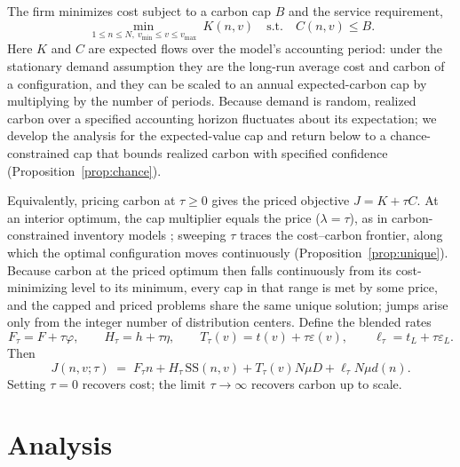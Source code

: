\documentclass[11pt]{article}
\theoremstyle{definition}
\theoremstyle{remark}
\theoremstyle{plain}
\newcommand{\sstock}{\mathrm{SS}}
\begin{document}
The firm minimizes cost subject to a carbon cap $B$ and the service requirement,
\begin{equation}\label{eq:Pcap}
  \min_{\,1\le n\le N,\ v_{\min}\le v\le v_{\max}}\ K(n,v)
  \quad\text{s.t.}\quad C(n,v)\le B .
\end{equation}
Here $K$ and $C$ are expected flows over the model's accounting period: under the stationary demand assumption they are the long-run average cost and carbon of a configuration, and they can be
scaled to an annual expected-carbon cap by multiplying by the number of periods. Because demand is random,
realized carbon over a specified accounting horizon fluctuates about its expectation; we develop the analysis
for the expected-value cap and return below to a chance-constrained cap that bounds realized carbon with
specified confidence (Proposition~\ref{prop:chance}).

Equivalently, pricing carbon at $\tau \ge 0$ gives the priced objective $J=K+\tau C$. At an interior optimum,
the cap multiplier equals the price ($\lambda=\tau$), as in carbon-constrained inventory models
\citep{chen2013carbon}; sweeping $\tau$ traces the cost--carbon frontier, along which the optimal
configuration moves continuously (Proposition~\ref{prop:unique}). Because carbon at the priced optimum then
falls continuously from its cost-minimizing level to its minimum, every cap in that range is met by some price,
and the capped and priced problems share the same unique solution; jumps arise only from the integer number of
distribution centers. Define the blended rates
\[
  F_\tau=F+\tau\varphi,\qquad H_\tau=h+\tau\eta,\qquad
  T_\tau(v)=t(v)+\tau\varepsilon(v),\qquad
  \ell_\tau=t_L+\tau\varepsilon_L .
\]
Then
\begin{equation}\label{eq:J}
  J(n,v;\tau) \;=\; F_\tau n + H_\tau\,\sstock(n,v)
     + T_\tau(v)N\mu D + \ell_\tau N\mu d(n).
\end{equation}
Setting $\tau=0$ recovers cost; the limit $\tau\to\infty$ recovers carbon up to scale.
\section{Analysis}\label{sec:analysis}
\end{document}

